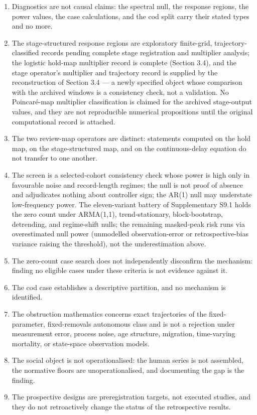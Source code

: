 \documentclass[11pt]{article}
\providecommand{\tightlist}{\setlength{\itemsep}{0pt}\setlength{\parskip}{0pt}}
\begin{document}
\begin{enumerate}
\def\labelenumi{(\roman{enumi})}
\tightlist
\item Diagnostics are not causal claims: the spectral null, the response regions, the power values, the case calculations, and the cod split carry their stated types and no more.
\item The stage-structured response regions are exploratory finite-grid, trajectory-classified records pending complete stage registration and multiplier analysis; the logistic hold-map multiplier record is complete (Section 3.4), and the stage operator's multiplier and trajectory record is supplied by the reconstruction of Section 3.4 --- a newly specified object whose comparison with the archived windows is a consistency check, not a validation. No Poincar\'e-map multiplier classification is claimed for the archived stage-output values, and they are not reproducible numerical propositions until the original computational record is attached.
\item The two review-map operators are distinct: statements computed on the hold map, on the stage-structured map, and on the continuous-delay equation do not transfer to one another.
\item The screen is a selected-cohort consistency check whose power is high only in favourable noise and record-length regimes; the null is not proof of absence and adjudicates nothing about controller sign; the AR(1) null may understate low-frequency power. The eleven-variant battery of Supplementary S9.1 holds the zero count under ARMA(1,1), trend-stationary, block-bootstrap, detrending, and regime-shift nulls; the remaining masked-peak risk runs via overestimated null power (unmodelled observation-error or retrospective-bias variance raising the threshold), not the underestimation above.
\item The zero-count case search does not independently disconfirm the mechanism: finding no eligible cases under these criteria is not evidence against it.
\item The cod case establishes a descriptive partition, and no mechanism is identified.
\item The obstruction mathematics concerns exact trajectories of the fixed-parameter, fixed-removals autonomous class and is not a rejection under measurement error, process noise, age structure, migration, time-varying mortality, or state-space observation models.
\item The social object is not operationalised: the human series is not assembled, the normative floors are unoperationalised, and documenting the gap is the finding.
\item The prospective designs are preregistration targets, not executed studies, and they do not retroactively change the status of the retrospective results.
\end{enumerate}
\end{document}
